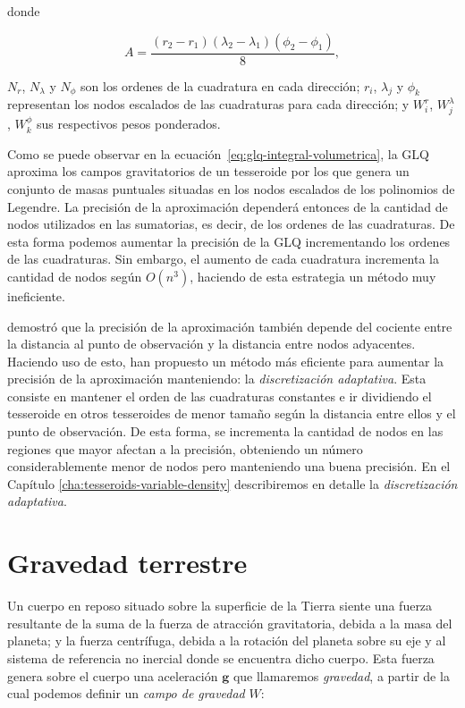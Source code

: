 \noindent donde

\begin{equation}
    A = \frac{
        (r_2 - r_1) (\lambda_2 - \lambda_1) (\phi_2 - \phi_1)
    }{8},
\end{equation}

\noindent $N_r$, $N_\lambda$ y $N_\phi$ son los ordenes de la cuadratura en
cada dirección; $r_i$, $\lambda_j$ y $\phi_k$ representan los nodos escalados
de las cuadraturas para cada dirección; y $W_i^r$, $W_j^\lambda$, $W_k^\phi$
sus respectivos pesos ponderados.

Como se puede observar en la ecuación~\ref{eq:glq-integral-volumetrica}, la
\ac{GLQ} aproxima los campos gravitatorios de un tesseroide por los que genera
un conjunto de masas puntuales situadas en los nodos escalados de los
polinomios de Legendre.
La precisión de la aproximación dependerá entonces de la cantidad de nodos
utilizados en las sumatorias, es decir, de los ordenes de las cuadraturas.
De esta forma podemos aumentar la precisión de la \ac{GLQ} incrementando los
ordenes de las cuadraturas.
Sin embargo, el aumento de cada cuadratura incrementa la cantidad de nodos
según $O(n^3)$, haciendo de esta estrategia un método muy ineficiente.

\citet{ku1977} demostró que la precisión de la aproximación también depende del
cociente entre la distancia al punto de observación y la distancia entre nodos
adyacentes.
Haciendo uso de esto, \citet{li2011} han propuesto un método más eficiente para
aumentar la precisión de la aproximación manteniendo: la \emph{discretización
adaptativa}.
Esta consiste en mantener el orden de las cuadraturas constantes e ir
dividiendo el tesseroide en otros tesseroides de menor tamaño según la
distancia entre ellos y el punto de observación.
De esta forma, se incrementa la cantidad de nodos en las regiones que mayor
afectan a la precisión, obteniendo un número considerablemente menor de nodos
pero manteniendo una buena precisión.
En el Capítulo \ref{cha:tesseroids-variable-density} describiremos en detalle
la \emph{discretización adaptativa}.



\section{Gravedad terrestre}

Un cuerpo en reposo situado sobre la superficie de la Tierra siente una fuerza
resultante de la suma de la fuerza de atracción gravitatoria, debida a la masa
del planeta; y la fuerza centrífuga, debida a la rotación del planeta sobre su
eje y al sistema de referencia no inercial donde se encuentra dicho
cuerpo.
Esta fuerza genera sobre el cuerpo una aceleración $\mathbf{g}$ que
llamaremos \emph{gravedad}, a partir de la cual podemos definir un
\emph{campo de gravedad} $W$:

